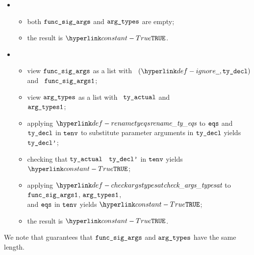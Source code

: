 \ProseParagraph
\OneApplies
\begin{itemize}
  \item {}
  \begin{itemize}
    \item both $\texttt{func\_sig\_args}$ and $\texttt{arg\_types}$ are empty;
    \item the result is $\True$.
  \end{itemize}

  \item {}
  \begin{itemize}
    \item view $\texttt{func\_sig\_args}$ as a list with \head\ $(\Ignore, \tydecl)$ and \tail\ $\texttt{func\_sig\_args1}$;
    \item view $\texttt{arg\_types}$ as a list with \head\ $\texttt{ty\_actual}$ and \tail\ \\
          $\texttt{arg\_types1}$;
    \item applying $\renametyeqs$ to $\texttt{eqs}$ and $\texttt{ty\_decl}$ in $\texttt{tenv}$
          to substitute parameter arguments in $\texttt{ty\_decl}$ yields $\texttt{ty\_decl'}$\ProseOrTypeError;
    \item checking that $\texttt{ty\_actual}$ \typesatisfies\ $\texttt{ty\_decl'}$ in $\texttt{tenv}$ yields $\True$\ProseOrTypeError;
    \item applying $\checkargstypesat$ to $\texttt{func\_sig\_args1}$, $\texttt{arg\_types1}$, \\
          and $\texttt{eqs}$ in $\texttt{tenv}$
          yields $\True$\ProseOrTypeError;
    \item the result is $\True$.
  \end{itemize}
\end{itemize}

\FormallyParagraph
We note that  guarantees
that $\texttt{func\_sig\_args}$ and $\texttt{arg\_types}$ have the same length.


